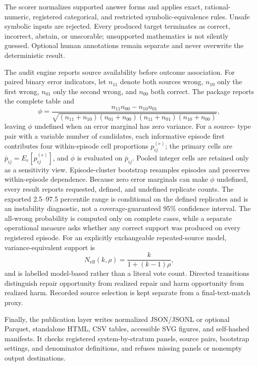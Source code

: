 \documentclass[preprint,12pt,a4paper]{elsarticle}
\begin{document}
The scorer normalizes supported answer forms and applies exact, rational-numeric,
registered categorical, and restricted symbolic-equivalence rules. Unsafe symbolic inputs are
rejected. Every produced target terminates as correct, incorrect, abstain, or
unscorable; unsupported mathematics is not silently guessed. Optional human
annotations remain separate and never overwrite the deterministic result.

The audit engine reports source availability before outcome association. For
paired binary error indicators, let $n_{11}$ denote both sources wrong,
$n_{10}$ only the first wrong, $n_{01}$ only the second wrong, and $n_{00}$ both
correct. The package reports the complete table and
\begin{equation}
\phi=\frac{n_{11}n_{00}-n_{10}n_{01}}
{\sqrt{(n_{11}+n_{10})(n_{01}+n_{00})(n_{11}+n_{01})(n_{10}+n_{00})}},
\end{equation}
leaving $\phi$ undefined when an error marginal has zero variance. For a source-
type pair with a variable number of candidates, each informative episode first
contributes four within-episode cell proportions $p_{ij}^{(e)}$; the primary
cells are $\bar p_{ij}=E_e[p_{ij}^{(e)}]$, and $\phi$ is evaluated on
$\bar p_{ij}$. Pooled integer cells are retained only as a sensitivity view.
Episode-cluster bootstrap resamples episodes and preserves within-episode
dependence. Because zero error marginals can make $\phi$ undefined, every result
reports requested, defined, and undefined replicate counts. The exported
2.5--97.5 percentile range is conditional on the defined replicates and is an
instability diagnostic, not a coverage-guaranteed 95\% confidence interval. The
all-wrong probability is computed only on complete cases, while a separate
operational measure asks whether any correct support was produced on every
registered episode. For an explicitly exchangeable repeated-source model,
variance-equivalent support is
\begin{equation}
N_{\mathrm{eff}}(k,\rho)=\frac{k}{1+(k-1)\rho},
\end{equation}
and is labelled model-based rather than a literal vote count. Directed
transitions distinguish repair opportunity from realized repair and harm
opportunity from realized harm. Recorded source selection is kept separate from
a final-text-match proxy.

Finally, the publication layer writes normalized JSON/JSONL or optional
Parquet, standalone HTML, CSV tables, accessible SVG figures, and self-hashed
manifests. It checks registered system-by-stratum panels, source pairs,
bootstrap settings, and denominator definitions, and refuses missing panels or
nonempty output destinations.
\end{document}
